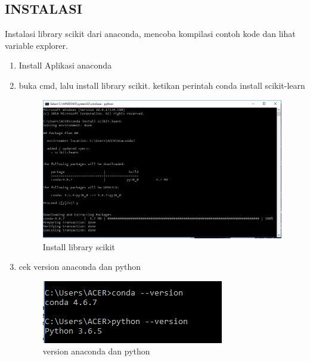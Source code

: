 \begin{enumerate}
\end{enumerate}

\subsection{INSTALASI}
Instalasi library scikit dari anaconda, mencoba kompilasi contoh kode dan lihat variable explorer.
\begin {enumerate}
\par
\item Install Aplikasi anaconda
\item buka cmd, lalu install library scikit. ketikan perintah conda install scikit-learn 
\par
\begin{figure}[ht]
\centering
\includegraphics[scale=0.5]{figures/111.png}
\caption{Install library scikit}
\label{contoh1}
\end{figure}
\par

\item cek version anaconda dan python
\par
\begin{figure}[ht]
\centering
\includegraphics[scale=0.7]{figures/222.png}
\caption{version anaconda dan python}
\label{contoh2}
\end{figure}
\par


\end{enumerate}
